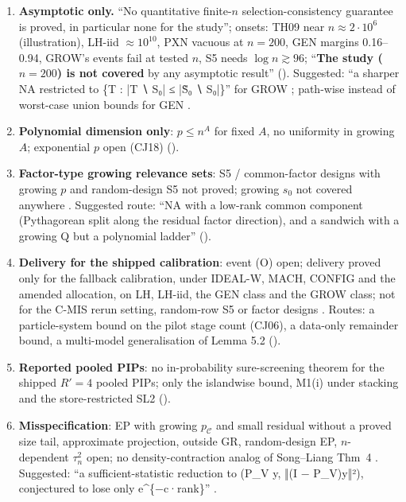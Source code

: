 \begin{enumerate}[label=F\arabic*.]
\item \textbf{Asymptotic only.} ``No quantitative finite-$n$ selection-consistency guarantee is proved, in particular none for the study''; onsets: TH09 near $n\approx2\cdot10^6$ (illustration), LH-iid $\approx10^{10}$, PXN vacuous at $n=200$, GEN margins 0.16--0.94, GROW's events fail at tested $n$, S5 needs $\log n\gtrsim96$; ``\textbf{The study ($n=200$) is not covered} by any asymptotic result''  (). Suggested: ``a sharper NA restricted to \{T : |T ∖ S₀| ≤ |S̃₀ ∖ S₀|\}'' for GROW ; path-wise instead of worst-case union bounds for GEN .
\item \textbf{Polynomial dimension only}: $p\le n^A$ for fixed $A$, no uniformity in growing $A$; exponential $p$ open (CJ18)  ().
\item \textbf{Factor-type growing relevance sets}: S5 / common-factor designs with growing $p$ and random-design S5 not proved; growing $s_0$ not covered anywhere . Suggested route: ``NA with a low-rank common component (Pythagorean split along the residual factor direction), and a sandwich with a growing Q but a polynomial ladder''  ().
\item \textbf{Delivery for the shipped calibration}: event (O) open; delivery proved only for the fallback calibration, under IDEAL-W, MACH, CONFIG and the amended allocation, on LH, LH-iid, the GEN class and the GROW class; not for the C-MIS rerun setting, random-row S5 or factor designs . Routes: a particle-system bound on the pilot stage count (CJ06), a data-only remainder bound, a multi-model generalisation of Lemma 5.2  ().
\item \textbf{Reported pooled PIPs}: no in-probability sure-screening theorem for the shipped $R'=4$ pooled PIPs; only the islandwise bound, M1(i) under stacking and the store-restricted SL2  ().
\item \textbf{Misspecification}: EP with growing $p_{\mathcal C}$ and small residual without a proved size tail, approximate projection, outside GR, random-design EP, $n$-dependent $\tau_n^2$ open; no density-contraction analog of Song--Liang Thm~4 . Suggested: ``a sufficient-statistic reduction to (P\_V y, ‖(I − P\_V)y‖²), conjectured to lose only e\textasciicircum{}\{−c·rank\}'' .

\end{enumerate}
